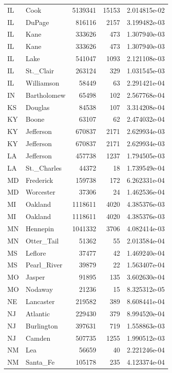 \documentclass[
  letterpaper,
  DIV=11,
  numbers=noendperiod]{scrreprt}
\renewcommand{\[}{\begin{equation}}
\renewcommand{\]}{\end{equation}}
\begin{document}
\begin{table}
\begin{tabular*}{\linewidth}{@{\extracolsep{\fill}}llrrr}
IL & Cook & 5139341 & 15153 & 2.014815e-02 \\ 
IL & DuPage & 816116 & 2157 & 3.199482e-03 \\ 
IL & Kane & 333626 & 473 & 1.307940e-03 \\ 
IL & Kane & 333626 & 473 & 1.307940e-03 \\ 
IL & Lake & 541047 & 1093 & 2.121108e-03 \\ 
IL & St.\_Clair & 263124 & 329 & 1.031545e-03 \\ 
IL & Williamson & 58449 & 63 & 2.291421e-04 \\ 
IN & Bartholomew & 65498 & 102 & 2.567768e-04 \\ 
KS & Douglas & 84538 & 107 & 3.314208e-04 \\ 
KY & Boone & 63107 & 62 & 2.474032e-04 \\ 
KY & Jefferson & 670837 & 2171 & 2.629934e-03 \\ 
KY & Jefferson & 670837 & 2171 & 2.629934e-03 \\ 
LA & Jefferson & 457738 & 1237 & 1.794505e-03 \\ 
LA & St.\_Charles & 44372 & 18 & 1.739549e-04 \\ 
MD & Frederick & 159738 & 172 & 6.262331e-04 \\ 
MD & Worcester & 37306 & 24 & 1.462536e-04 \\ 
MI & Oakland & 1118611 & 4020 & 4.385376e-03 \\ 
MI & Oakland & 1118611 & 4020 & 4.385376e-03 \\ 
MN & Hennepin & 1041332 & 3706 & 4.082414e-03 \\ 
MN & Otter\_Tail & 51362 & 55 & 2.013584e-04 \\ 
MS & Leflore & 37477 & 42 & 1.469240e-04 \\ 
MS & Pearl\_River & 39879 & 22 & 1.563407e-04 \\ 
MO & Jasper & 91895 & 135 & 3.602630e-04 \\ 
MO & Nodaway & 21236 & 15 & 8.325312e-05 \\ 
NE & Lancaster & 219582 & 389 & 8.608441e-04 \\ 
NJ & Atlantic & 229430 & 379 & 8.994520e-04 \\ 
NJ & Burlington & 397631 & 719 & 1.558863e-03 \\ 
NJ & Camden & 507735 & 1255 & 1.990512e-03 \\ 
NM & Lea & 56659 & 40 & 2.221246e-04 \\ 
NM & Santa\_Fe & 105178 & 235 & 4.123374e-04 \\ 

\end{tabular*}
\end{table}
\end{document}
